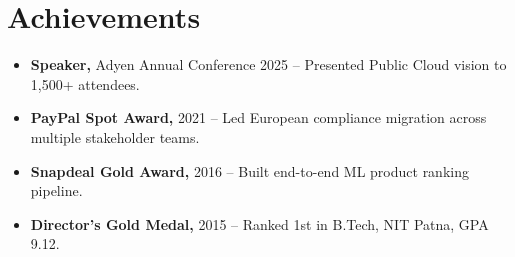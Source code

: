 \documentclass[9pt,a4paper]{article}
\begin{document}
\begin{minipage}[t]{0.685\textwidth}
\section{Achievements}
\begin{itemize}[itemsep=2pt]
  \item \textbf{Speaker,} Adyen Annual Conference 2025 {\small\color{mid}-- Presented Public Cloud vision to 1,500+ attendees.}
  \item \textbf{PayPal Spot Award,} 2021 {\small\color{mid}-- Led European compliance migration across multiple stakeholder teams.}
  \item \textbf{Snapdeal Gold Award,} 2016 {\small\color{mid}-- Built end-to-end ML product ranking pipeline.}
  \item \textbf{Director's Gold Medal,} 2015 {\small\color{mid}-- Ranked 1st in B.Tech, NIT Patna, GPA 9.12.}
\end{itemize}

\end{minipage}
\end{document}
